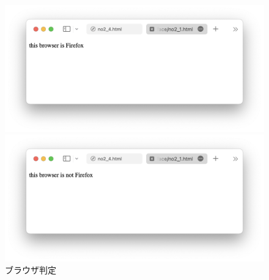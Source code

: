 \section{\result}
\begin{figure}[H]
    \centering
    \begin{minipage}{.49\textwidth}
        \centering
        \includegraphics[keepaspectratio,width=\textwidth]{../../09_WebInterface/no2_1_f.png}
    \end{minipage}
    \begin{minipage}{.49\textwidth}
        \centering
        \includegraphics[keepaspectratio,width=\textwidth]{../../09_WebInterface/no2_1_nf.png}
    \end{minipage}
    \caption{ブラウザ判定}
\end{figure}
